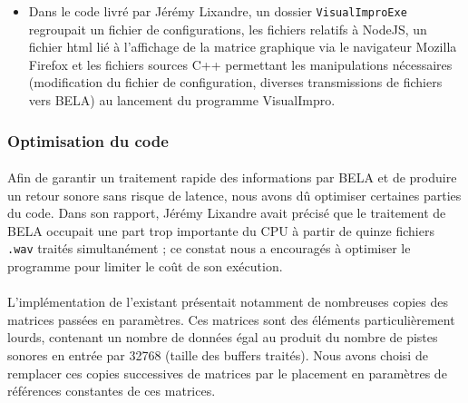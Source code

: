 \begin{itemize}
          \item Dans le code livré par Jérémy Lixandre, un dossier
            \verb!VisualImproExe! regroupait un fichier de
            configurations, les fichiers relatifs à NodeJS, un fichier
            html lié à l'affichage de la matrice graphique via le
            navigateur Mozilla Firefox et les fichiers sources C++
            permettant les manipulations nécessaires (modification du
            fichier de configuration, diverses transmissions de
            fichiers vers BELA) au lancement du programme VisualImpro.
\end{itemize}

\subsubsection{Optimisation du code}
\paragraph{}
Afin de garantir un traitement rapide des informations par BELA et de
produire un retour sonore sans risque de latence, nous avons dû
optimiser certaines parties du code. Dans son rapport, Jérémy Lixandre
avait précisé que le traitement de BELA occupait une part trop
importante du CPU à partir de quinze fichiers \verb!.wav! traités
simultanément ; ce constat nous a encouragés à optimiser le programme
pour limiter le coût de son exécution.
\paragraph{}
L'implémentation de l'existant présentait notamment de nombreuses
copies des matrices passées en paramètres. Ces matrices sont des
éléments particulièrement lourds, contenant un nombre de données égal
au produit du nombre de pistes sonores en entrée par 32768 (taille des
buffers traités). Nous avons choisi de remplacer ces copies
successives de matrices par le placement en paramètres de références
constantes de ces matrices.

